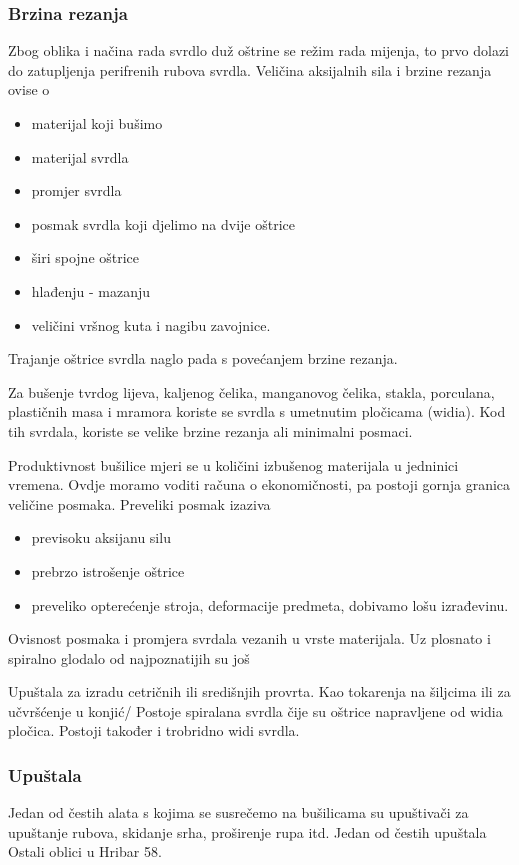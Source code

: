 \documentclass[a4paper,12pt]{article}
\numberwithin{figure}{section}
\begin{document}
\subsubsection{Brzina rezanja}
Zbog oblika i načina rada svrdlo duž oštrine se režim rada mijenja, to prvo dolazi do zatupljenja perifrenih rubova svrdla. Veličina aksijalnih sila i brzine rezanja ovise o 
\begin{itemize}
\item materijal koji bušimo
\item materijal svrdla
\item promjer svrdla
\item posmak svrdla koji djelimo na dvije oštrice
\item širi spojne oštrice 
\item hlađenju - mazanju
\item veličini vršnog kuta i nagibu zavojnice.
\end{itemize}
Trajanje oštrice svrdla naglo pada s povećanjem brzine rezanja.\par
Za bušenje tvrdog lijeva, kaljenog čelika, manganovog čelika, stakla, porculana, plastičnih masa i mramora koriste se svrdla s umetnutim pločicama (widia). Kod tih svrdala, koriste se velike brzine rezanja ali minimalni posmaci.\par
Produktivnost bušilice mjeri se u količini izbušenog materijala u jedninici vremena. Ovdje moramo voditi računa o ekonomičnosti, pa postoji gornja granica veličine posmaka. Preveliki posmak izaziva
\begin{itemize}
\item previsoku aksijanu silu
\item prebrzo istrošenje oštrice
\item preveliko opterećenje stroja, deformacije predmeta, dobivamo lošu izrađevinu.
\end{itemize}
Ovisnost posmaka i promjera svrdala vezanih u vrste materijala.
Uz plosnato i spiralno glodalo od najpoznatijih su još

Upuštala za izradu cetričnih ili središnjih provrta. Kao tokarenja na šiljcima ili za učvršćenje u konjić/
Postoje spiralana svrdla čije su oštrice napravljene od widia pločica. Postoji također i trobridno widi svrdla.
\subsubsection{Upuštala}
Jedan od čestih alata s kojima se susrečemo na bušilicama su upuštivači za upuštanje rubova, skidanje srha, proširenje rupa itd. Jedan od čestih upuštala
Ostali oblici u Hribar 58.
\end{document}
